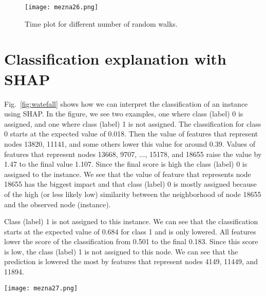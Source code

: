 \documentclass[twoside,11pt]{article}
\begin{document}
\begin{figure}[t!]
  \centering
  \texttt{[image: mezna26.png]}
  \caption{Time plot for different number of random walks.}
  \label{fig:timewalks}
\end{figure}

\section{Classification explanation with SHAP}
\label{sec:app-shap}

Fig.~\ref{fig:watefall} shows how we can interpret the classification of an instance using SHAP. In the figure, we see two examples, one where class (label) 0 is assigned, and one where class (label) 1 is not assigned. The classification for class 0 starts at the expected value of 0.018. Then the value of features that represent nodes 13820, 11141, and some others lower this value for around 0.39. Values of features that represent nodes 13668, 9707, ..., 15178, and 18655 raise the value by 1.47 to the final value 1.107. Since the final score is high the class (label) 0 is assigned to the instance. We see that the value of feature that represents node 18655 has the biggest impact and that class (label) 0 is mostly assigned because of the high (or less likely low) similarity between the neighborhood of node 18655 and the observed node (instance).

Class (label) 1 is not assigned to this instance. We can see that the classification starts at the expected value of 0.684 for class 1 and is only lowered. All features lower the score of the classification from 0.501 to the final 0.183. Since this score is low, the class (label) 1 is not assigned to this node. We can see that the prediction is lowered the most by features that represent nodes 4149, 11449, and 11894.

\begin{figure*}[h!]
  \centering
  \texttt{[image: mezna27.png]}
  \caption{Waterfall explanation for classification of a node.}
  \label{fig:watefall}
\end{figure*}
\end{document}
